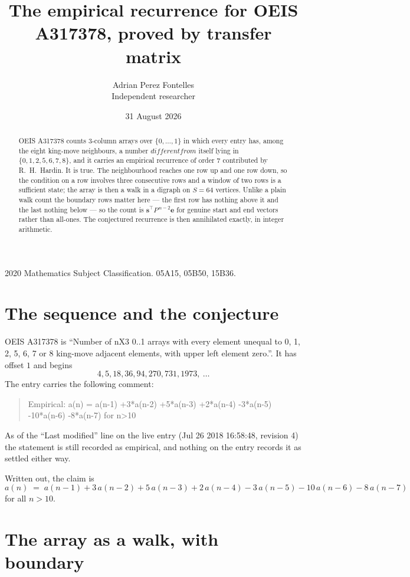 \documentclass[11pt,a4paper]{article}
\title{The empirical recurrence for OEIS A317378, proved by transfer matrix}
\author{Adrian Perez Fontelles\\ \small Independent researcher}
\date{31 August 2026}
\theoremstyle{plain}
\theoremstyle{definition}
\begin{document}
\maketitle

\begin{abstract}
OEIS A317378 counts $3$-column arrays over $\{0,\dots,1\}$ in which every entry has,
among the eight king-move neighbours, a number $different from$ itself lying in $\{0,1,2,5,6,7,8\}$, and it carries an empirical
recurrence of order $7$ contributed by R.~H.~Hardin. It is true. The neighbourhood
reaches one row up and one row down, so the condition on a row involves three consecutive
rows and a window of two rows is a sufficient state; the array is then a walk in a digraph
on $S=64$ vertices. Unlike a plain walk count the boundary rows matter here --- the first
row has nothing above it and the last nothing below --- so the count is
$\mathbf{s}^{\!\top}P^{\,n-2}\mathbf{e}$ for genuine start and end vectors rather than
all-ones. The conjectured recurrence is then annihilated exactly, in integer arithmetic.
\end{abstract}

\noindent\small 2020 Mathematics Subject Classification. 05A15, 05B50, 15B36.\normalsize

\section{The sequence and the conjecture}

OEIS A317378 is ``Number of nX3 0..1 arrays with every element unequal to 0, 1, 2, 5, 6, 7 or 8 king-move adjacent elements, with upper left element zero.''. It has offset
$1$ and begins
\[
4, 5, 18, 36, 94, 270, 731, 1973,\ \dots
\]
The entry carries the following comment:
\begin{quote}\small
Empirical: a(n) = a(n-1) +3*a(n-2) +5*a(n-3) +2*a(n-4) -3*a(n-5) -10*a(n-6) -8*a(n-7) for n>10
\end{quote}
As of the ``Last modified'' line on the live entry (Jul 26 2018 16:58:48, revision
4) the statement is still recorded as empirical, and nothing on the entry
records it as settled either way.

Written out, the claim is
\begin{equation}\label{eq:conj}
a(n)\;=\;a(n-1) + 3\,a(n-2) + 5\,a(n-3) + 2\,a(n-4) - 3\,a(n-5) - 10\,a(n-6) - 8\,a(n-7)
\end{equation}
for all $n>10$.

\section{The array as a walk, with boundary}
\end{document}
